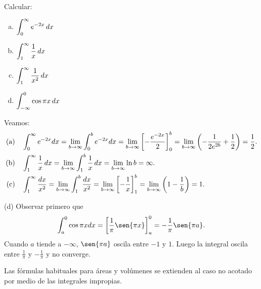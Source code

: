 \begin{example}
  Calcular:
  \begin{multicols}{2}
    \begin{enumerate}[(a)]
      \item $\displaystyle \int_0^\infty e^{-2x} \,dx$
      \item $\displaystyle \int_1^\infty \frac{1}{x} \,dx$
      \item $\displaystyle \int_1^\infty \frac{1}{x^2} \,dx$
      \item $\displaystyle  \int_{-\infty}^0 \cos{\pi x} \,dx $
    \end{enumerate}
  \end{multicols}

  Veamos: 
  \begin{align*}
    \text{(a)}\quad&
    \int_0^\infty e^{-2x} dx 
    = \lim_{b \to \infty} \int_0^b e^{-2x} dx 
    = \lim_{b \to \infty} \left[-\frac{e^{-2x}}{2}\right]_0^b 
    = \lim_{b \to \infty} \left(-\frac{1}{2e^{2b}} + \frac{1}{2}\right) 
    = \frac{1}{2}.
    \\
    \text{(b)}\quad&
    \int_1^\infty \frac{1}{x}\,dx = \lim_{b \to \infty} \int_1^b \frac{1}{x}\,dx = \lim_{b \to \infty} \ln{b} = \infty.
    \\
    \text{(c)}\quad&
    \int_1^\infty \frac{dx}{x^2} = \lim_{b \to \infty} \int_1^b \frac{dx}{x^2} = \lim_{b \to \infty} \left[-\frac{1}{x}\right]_1^b = \lim_{b \to \infty} \left(1 - \frac{1}{b}\right) = 1.
  \end{align*}

  (d) Observar primero que
  \[
\int_a^0 \cos{\pi x} dx = \left[\frac{1}{\pi}\sen{\pi x}\right]_a^0 = -\frac{1}{\pi}\sen{\pi a}.
\]
Cuando $a$ tiende a $-\infty$, $\sen{\pi a}$ oscila entre $-1$ y $1$.
Luego la integral oscila entre $\frac{1}{\pi}$ y $-\frac{1}{\pi}$ y no converge.
\end{example}

Las fórmulas habituales para áreas y volúmenes se extienden al caso no acotado por medio de
las integrales impropias.

